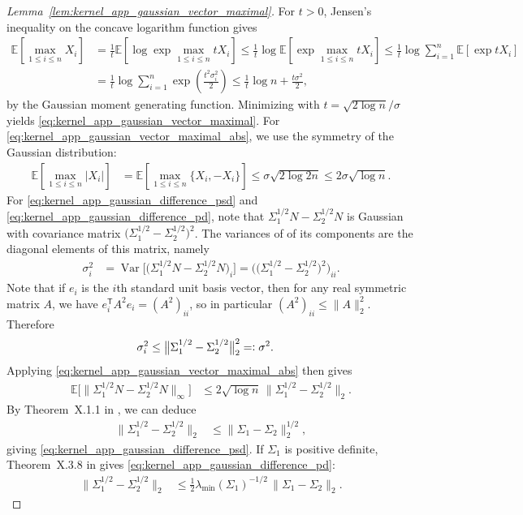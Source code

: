 \documentclass[11pt,lof]{puthesis}
\newcommand{\E}{\ensuremath{\mathbb{E}}}
\newcommand{\T}{\ensuremath{\mathsf{T}}}
\DeclareMathOperator{\Var}{Var}
\theoremstyle{break}
\theoremstyle{proof}
\newtheorem{proof}{Proof}
\begin{document}
\begin{proof}[Lemma~\ref{lem:kernel_app_gaussian_vector_maximal}]

For $t > 0$,
Jensen's inequality on the concave logarithm function
gives
%
\begin{align*}
\E\left[
\max_{1 \leq i \leq n}
X_i
\right]
&=
\frac{1}{t}
\E\left[
\log
\exp
\max_{1 \leq i \leq n}
t X_i
\right]
\leq
\frac{1}{t}
\log
\E\left[
\exp
\max_{1 \leq i \leq n}
t X_i
\right]
\leq
\frac{1}{t}
\log
\sum_{i=1}^n
\E\left[
\exp
t X_i
\right] \\
&=
\frac{1}{t}
\log
\sum_{i=1}^n
\exp
\left(
\frac{t^2 \sigma_i^2}{2}
\right)
\leq
\frac{1}{t}
\log n
+ \frac{t \sigma^2}{2},
\end{align*}
%
by the Gaussian moment generating function.
Minimizing with $t = \sqrt{2 \log n} / \sigma$
yields \eqref{eq:kernel_app_gaussian_vector_maximal}.
For \eqref{eq:kernel_app_gaussian_vector_maximal_abs},
we use the symmetry of the Gaussian distribution:
%
\begin{align*}
\E\left[
\max_{1 \leq i \leq n}
|X_i|
\right]
&=
\E\left[
\max_{1 \leq i \leq n}
\{X_i, -X_i\}
\right]
\leq
\sigma \sqrt{2 \log 2n}
\leq
2 \sigma \sqrt{\log n}.
\end{align*}
%
For \eqref{eq:kernel_app_gaussian_difference_psd}
and \eqref{eq:kernel_app_gaussian_difference_pd},
note that
$\Sigma_1^{1/2} N - \Sigma_2^{1/2} N$
is Gaussian with covariance matrix
$\big(\Sigma_1^{1/2} - \Sigma_2^{1/2}\big)^2$.
The variances of of its components are the diagonal
elements of this matrix, namely
%
\begin{align*}
\sigma_i^2
&=
\Var\big[
\big(\Sigma_1^{1/2} N - \Sigma_2^{1/2} N\big)_i
\big]
=
\Big(\big(
\Sigma_1^{1/2} - \Sigma_2^{1/2}
\big)^2\Big)_{ii}.
\end{align*}
%
Note that if $e_i$ is the
$i$th standard unit basis vector,
then for any real symmetric matrix $A$,
we have
$e_i^\T A^2 e_i = (A^2)_{ii}$,
so in particular
$(A^2)_{ii} \leq \|A\|_2^2$.
Therefore
%
\begin{align*}
\sigma_i^2
&\leq
\big\|
\Sigma_1^{1/2} - \Sigma_2^{1/2}
\big\|_2^2
=\vcentcolon
\sigma^2.
\end{align*}
%
Applying
\eqref{eq:kernel_app_gaussian_vector_maximal_abs}
then gives
%
\begin{align*}
\E\Big[
\big\|
\Sigma_1^{1/2} N
- \Sigma_2^{1/2} N
\big\|_\infty
\Big]
&\leq
2 \sqrt{\log n} \,
\big\|
\Sigma_1^{1/2} - \Sigma_2^{1/2}
\big\|_2.
\end{align*}
%
By Theorem~X.1.1
in \citet{bhatia1997matrix},
we can deduce
%
\begin{align*}
\big\|
\Sigma_1^{1/2} - \Sigma_2^{1/2}
\big\|_2
&\leq
\big\|
\Sigma_1 - \Sigma_2
\big\|_2^{1/2},
\end{align*}
%
giving
\eqref{eq:kernel_app_gaussian_difference_psd}.
If $\Sigma_1$
is positive definite,
Theorem~X.3.8 in
\citet{bhatia1997matrix} gives
\eqref{eq:kernel_app_gaussian_difference_pd}:
%
\begin{align*}
\big\|
\Sigma_1^{1/2} - \Sigma_2^{1/2}
\big\|_2
&\leq
\frac{1}{2}
\lambda_{\min}(\Sigma_1)^{-1/2} \,
\big\|
\Sigma_1 - \Sigma_2
\big\|_2.
\end{align*}
%
\end{proof}
\end{document}
